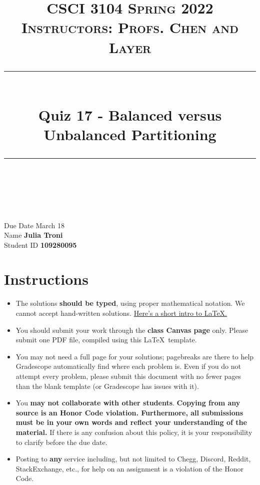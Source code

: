 \documentclass[11pt]{article}
\title{
\normalfont \normalsize 
\textsc{CSCI 3104 Spring 2022 \\ 
Instructors: Profs. Chen and Layer} \\
[10pt] 
\rule{\linewidth}{0.5pt} \\[6pt] 
\huge Quiz 17 - Balanced versus Unbalanced Partitioning \\
\rule{\linewidth}{2pt}  \\[10pt]
}
\date{}
\theoremstyle{definition}
\theoremstyle{definition}
\theoremstyle{definition}
\begin{document}

\maketitle


\noindent
Due Date \dotfill March 18 \\
Name \dotfill \textbf{Julia Troni} \\
Student ID \dotfill \textbf{109280095} \\

\tableofcontents

\section{Instructions}
 \begin{itemize}
	\item The solutions \textbf{should be typed}, using proper mathematical notation. We cannot accept hand-written solutions. \href{http://ece.uprm.edu/~caceros/latex/introduction.pdf}{Here's a short intro to \LaTeX.}
	\item You should submit your work through the \textbf{class Canvas page} only. Please submit one PDF file, compiled using this \LaTeX \ template.
	\item You may not need a full page for your solutions; pagebreaks are there to help Gradescope automatically find where each problem is. Even if you do not attempt every problem, please submit this document with no fewer pages than the blank template (or Gradescope has issues with it).

	\item You \textbf{may not collaborate with other students}. \textbf{Copying from any source is an Honor Code violation. Furthermore, all submissions must be in your own words and reflect your understanding of the material.} If there is any confusion about this policy, it is your responsibility to clarify before the due date. 

	\item Posting to \textbf{any} service including, but not limited to Chegg, Discord, Reddit, StackExchange, etc., for help on an assignment is a violation of the Honor Code.

\end{itemize}
\end{document}
